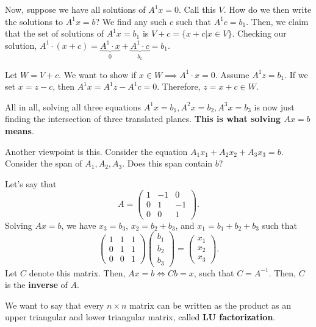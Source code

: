 Now, suppose we have all solutions of \( A^{1}x=0  \). Call this \( V \). How do we then write the solutions to \( A^{1}x=b  \)? We find any such \( c \) such that \( A^{1}c=b_{1}  \). Then, we claim that the set of solutions of \( A^{1}x=b_{1}  \) is \( V+c = \{x+c | x \in V\}   \). Checking our solution, \( A^{1}\cdot (x+c)=\underbrace{A^{1}\cdot x}_{0} + \underbrace{A^{1}\cdot c}_{b_{1}} = b_{1} \).

Let \( W = V + c \). We want to show if \( x \in W \implies A^{1}\cdot x=0  \). Assume \( A^{1}z = b_{1} \).  If we set \( x=z-c \), then \( A^{1}x = A^{1}z - A^{1}c=0    \). Therefore, \( z = x + c \in W\).

All in all, solving all three equations \( A^{1}x=b_{1},A^{2}x=b_{2},A^{3}x=b_{3}    \) is now just finding the intersection of three translated planes. \textbf{This is what solving \( Ax=b \) means}.

Another viewpoint is this. Consider the equation \( A_{1}x_{1}+A_{2}x_{2}+A_{3}x_{3}=b \). Consider the span of \( A_{1},A_{2},A_{3} \). Does this span contain \( b \)?

\begin{eg}
	Let's say that \[
		A = \begin{pmatrix}
			1 & -1 & 0 \\ 0 & 1 & -1 \\ 0 & 0 & 1
		\end{pmatrix}
	.\] Solving \( Ax=b \), we have \( x_{3}=b_{3} \), \( x_{2}=b_{2}+b_{3} \), and \( x_{1}=b_{1}+b_{2}+b_{3} \) such that \[
		\begin{pmatrix}
			1 & 1 & 1 \\ 0 & 1 & 1 \\ 0 & 0 & 1
		\end{pmatrix} \begin{pmatrix}
			b_{1} \\ b_{2} \\ b_{3}
		\end{pmatrix} = \begin{pmatrix}
			x_{1} \\ x_{2} \\ x_{3}
		\end{pmatrix}
	.\] Let \( C \) denote this matrix. Then, \( Ax=b \iff Cb=x \), such that \( C=A^{-1}  \). Then, \( C \) is the \textbf{inverse} of \( A \).
\end{eg}

\begin{definition}
	We want to say that every \( n\times n \) matrix can be written as the product as an upper triangular and lower triangular matrix, called \textbf{LU factorization}.
\end{definition}


